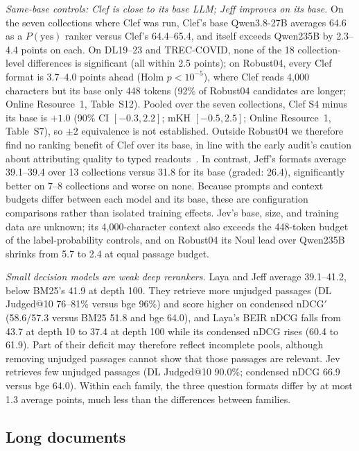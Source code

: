 \emph{Same-base controls: Clef is close to its base LLM; Jeff improves on its base.} On the seven collections where Clef was run, Clef's base Qwen3.8-27B averages 64.6 as a $P(\text{yes})$ ranker versus Clef's 64.4--65.4, and itself exceeds Qwen235B by 2.3--4.4 points on each. On DL19--23 and TREC-COVID, none of the 18 collection-level differences is significant (all within 2.5 points); on Robust04, every Clef format is 3.7--4.0 points ahead (Holm $p<10^{-5}$), where Clef reads 4{,}000 characters but its base only 448 tokens (92\% of Robust04 candidates are longer; Online Resource~1, Table~S12). Pooled over the seven collections, Clef S4 minus its base is $+1.0$ (90\% CI $[-0.3,2.2]$; mKH $[-0.5,2.5]$; Online Resource~1, Table~S7), so $\pm2$ equivalence is not established. Outside Robust04 we therefore find no ranking benefit of Clef over its base, in line with the early audit's caution about attributing quality to typed readouts~\cite{tang2026tdmaudit}. In contrast, Jeff's formats average 39.1--39.4 over 13 collections versus 31.8 for its base (graded: 26.4), significantly better on 7--8 collections and worse on none. Because prompts and context budgets differ between each model and its base, these are configuration comparisons rather than isolated training effects. Jev's base, size, and training data are unknown; its 4{,}000-character context also exceeds the 448-token budget of the label-probability controls, and on Robust04 its Noul lead over Qwen235B shrinks from 5.7 to 2.4 at equal passage budget.

\emph{Small decision models are weak deep rerankers.} Laya and Jeff average 39.1--41.2, below BM25's 41.9 at depth 100. They retrieve more unjudged passages (DL Judged@10 76--81\% versus bge 96\%) and score higher on condensed nDCG$'$ (58.6/57.3 versus BM25 51.8 and bge 64.0), and Laya's BEIR nDCG falls from 43.7 at depth 10 to 37.4 at depth 100 while its condensed nDCG rises (60.4 to 61.9). Part of their deficit may therefore reflect incomplete pools, although removing unjudged passages cannot show that those passages are relevant. Jev retrieves few unjudged passages (DL Judged@10 90.0\%; condensed nDCG 66.9 versus bge 64.0).
Within each family, the three question formats differ by at most 1.3 average points, much less than the differences between families.


\subsection{Long documents}

